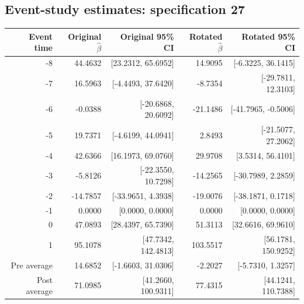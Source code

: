 \documentclass[10pt]{article}
\begin{document}
\subsection*{Event-study estimates: specification 27}
\begin{center}\scriptsize
\begin{tabular}{r rr rr}
\toprule
Event time & Original $\hat\beta$ & Original 95\% CI & Rotated $\hat\beta$ & Rotated 95\% CI \\
\midrule
-8 & 44.4632 & [23.2312, 65.6952] & 14.9095 & [-6.3225, 36.1415] \\
-7 & 16.5963 & [-4.4493, 37.6420] & -8.7354 & [-29.7811, 12.3103] \\
-6 & -0.0388 & [-20.6868, 20.6092] & -21.1486 & [-41.7965, -0.5006] \\
-5 & 19.7371 & [-4.6199, 44.0941] & 2.8493 & [-21.5077, 27.2062] \\
-4 & 42.6366 & [16.1973, 69.0760] & 29.9708 & [3.5314, 56.4101] \\
-3 & -5.8126 & [-22.3550, 10.7298] & -14.2565 & [-30.7989, 2.2859] \\
-2 & -14.7857 & [-33.9651, 4.3938] & -19.0076 & [-38.1871, 0.1718] \\
-1 & 0.0000 & [0.0000, 0.0000] & 0.0000 & [0.0000, 0.0000] \\
0 & 47.0893 & [28.4397, 65.7390] & 51.3113 & [32.6616, 69.9610] \\
1 & 95.1078 & [47.7342, 142.4813] & 103.5517 & [56.1781, 150.9252] \\
\midrule
Pre average & 14.6852 & [-1.6603, 31.0306] & -2.2027 & [-5.7310, 1.3257] \\
Post average & 71.0985 & [41.2660, 100.9311] & 77.4315 & [44.1241, 110.7388] \\
\bottomrule
\end{tabular}
\end{center}
\clearpage
\end{document}
